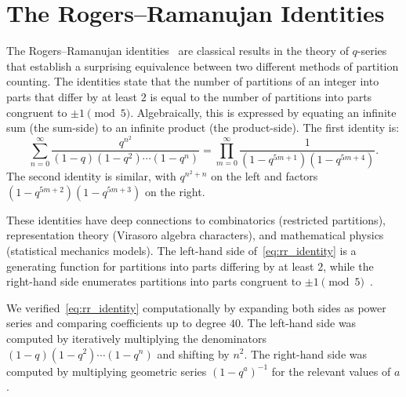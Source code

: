 \documentclass[10pt]{amsart}
\theoremstyle{plain}
\theoremstyle{definition}
\theoremstyle{remark}
\begin{document}
\section{The Rogers--Ramanujan Identities}
\label{sec:rr}

The Rogers--Ramanujan identities~\cite{rogers_1894,schur_1917} are classical results in the theory of $q$-series that establish a surprising equivalence between two different methods of partition counting. The identities state that the number of partitions of an integer into parts that differ by at least $2$ is equal to the number of partitions into parts congruent to $\pm 1 \pmod{5}$. Algebraically, this is expressed by equating an infinite sum (the sum-side) to an infinite product (the product-side). The first identity is:
\begin{equation}
\label{eq:rr_identity}
\sum_{n=0}^{\infty}
\frac{q^{n^2}}{(1-q)(1-q^2)\cdots(1-q^n)}
=
\prod_{m=0}^{\infty}
\frac{1}{(1-q^{5m+1})(1-q^{5m+4})}.
\end{equation}
The second identity is similar, with $q^{n^2+n}$ on the left and
factors $(1-q^{5m+2})(1-q^{5m+3})$ on the right.

These identities have deep connections to combinatorics (restricted
partitions), representation theory (Virasoro algebra characters), and
mathematical physics (statistical mechanics models). The left-hand side
of~\eqref{eq:rr_identity} is a generating function for partitions into
parts differing by at least $2$, while the right-hand side enumerates
partitions into parts congruent to $\pm 1 \pmod{5}$~\cite{andrews_q}.

We verified~\eqref{eq:rr_identity} computationally by expanding both
sides as power series and comparing coefficients up to degree $40$.
The left-hand side was computed by iteratively multiplying the
denominators $(1-q)(1-q^2)\cdots(1-q^n)$ and shifting by $n^2$. The
right-hand side was computed by multiplying geometric series
$(1-q^a)^{-1}$ for the relevant values of $a$.
\end{document}
